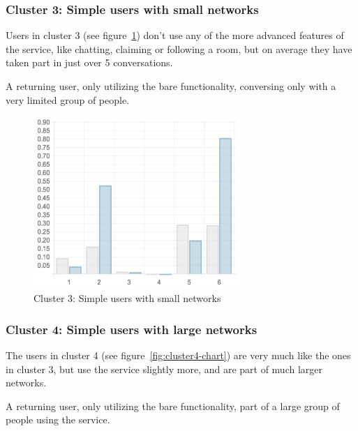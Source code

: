 \subsubsection{Cluster 3: Simple users with small networks}

Users in cluster 3 (see figure~\ref{fig:cluster3-chart}) don't use any of the more advanced features of the service, like chatting, claiming or following a room, but on average they have taken part in just over 5 conversations.

\begin{persona}
  A returning user, only utilizing the bare functionality, conversing only with a very limited group of people.
\end{persona}

\begin{figure}[h]
  \centering
    \includegraphics[width=0.7\textwidth]{Figures/clusterings/confluence-post/cluster3-chart}
    \caption{Cluster 3: Simple users with small networks}
    \label{fig:cluster3-chart}
\end{figure}

\subsubsection{Cluster 4: Simple users with large networks}

The users in cluster 4 (see figure~\ref{fig:cluster4-chart}) are very much like the ones in cluster 3, but use the service slightly more, and are part of much larger networks.

\begin{persona}
  A returning user, only utilizing the bare functionality, part of a large group of people using the service.
\end{persona}

